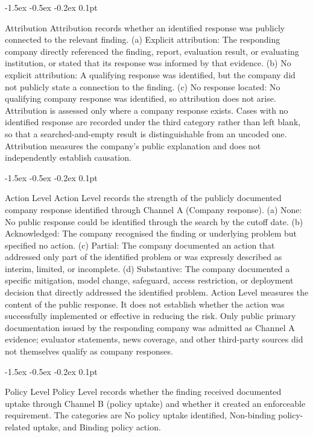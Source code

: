 \documentclass{article}
\makeatletter
\renewcommand{\subsubsection}{%
  \@startsection{subsubsection}{3}{\z@}%
                {-1.5ex \@plus -0.5ex \@minus -0.2ex}%
                {0.1pt}%
                {\normalsize\bf\raggedright}%
}
\makeatother
\begin{document}
\subsubsection{Attribution}\label{sec:attribution}
Attribution records whether an identified response was publicly connected to the relevant finding. (a) Explicit attribution: The responding company directly referenced the finding, report, evaluation result, or evaluating institution, or stated that its response was informed by that evidence. (b) No explicit attribution: A qualifying response was identified, but the company did not publicly state a connection to the finding. (c) No response located: No qualifying company response was identified, so attribution does not arise. Attribution is assessed only where a company response exists. Cases with no identified response are recorded under the third category rather than left blank, so that a searched-and-empty result is distinguishable from an uncoded one. Attribution measures the company's public explanation and does not independently establish causation.

\subsubsection{Action Level}\label{sec:action-level}
Action Level records the strength of the publicly documented company response identified through Channel A (Company response). (a) None: No public response could be identified through the search by the cutoff date. (b) Acknowledged: The company recognised the finding or underlying problem but specified no action. (c) Partial: The company documented an action that addressed only part of the identified problem or was expressly described as interim, limited, or incomplete. (d) Substantive: The company documented a specific mitigation, model change, safeguard, access restriction, or deployment decision that directly addressed the identified problem. Action Level measures the content of the public response. It does not establish whether the action was successfully implemented or effective in reducing the risk. Only public primary documentation issued by the responding company was admitted as Channel A evidence; evaluator statements, news coverage, and other third-party sources did not themselves qualify as company responses.

\subsubsection{Policy Level}\label{sec:policy-level}
Policy Level records whether the finding received documented uptake through Channel B (policy uptake) and whether it created an enforceable requirement. The categories are No policy uptake identified, Non-binding policy-related uptake, and Binding policy action.
\end{document}
